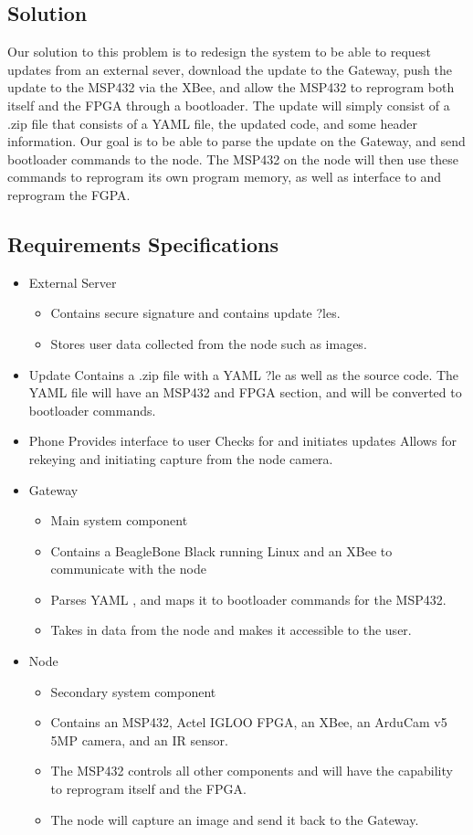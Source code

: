 \documentclass[11pt]{article}
\begin{document}
\subsection{Solution}
Our solution to this problem is to redesign the system to be able to request updates from an external sever, download the update to the Gateway, push the update to the MSP432 via the XBee, and allow the MSP432 to reprogram both itself and the FPGA through a bootloader. The update will simply consist of a .zip file that consists of a YAML file, the updated code, and some header information. Our goal is to be able to parse the update on the Gateway, and send bootloader commands to the node. The MSP432 on the node will then use these commands to reprogram its own program memory, as well as interface to and reprogram the FGPA. 


\subsection{Requirements Specifications}

\begin{itemize}
\item External Server 
\begin{itemize}
\item Contains secure signature and contains update ?les.
\item Stores user data collected from the node such as images.
\end{itemize}
\item Update
Contains a .zip file with a YAML ?le as well as the source code.
The YAML file will have an MSP432 and FPGA section, and will be converted to bootloader commands.
\item Phone
Provides interface to user
Checks for and initiates updates
Allows for rekeying and initiating capture from the node camera.
\item Gateway
\begin{itemize}
\item Main system component
\item Contains a BeagleBone Black running Linux and an XBee to communicate with the node
\item Parses YAML , and maps it to bootloader commands for the MSP432.
\item Takes in data from the node and makes it accessible to the user.
\end{itemize}
\item Node
\begin{itemize}
\item Secondary system component
\item Contains an MSP432, Actel IGLOO FPGA, an XBee, an ArduCam v5 5MP camera, and an IR sensor.
\item The MSP432 controls all other components and will have the capability to reprogram itself and the FPGA.
\item The node will capture an image and send it back to the Gateway.
\end{itemize}
\end{itemize}
\end{document}
